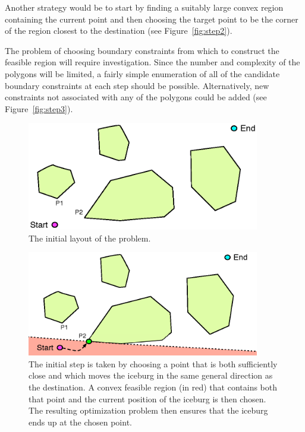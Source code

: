 \documentclass[12pt]{article}
\begin{document}
Another strategy would be to start by finding a suitably large convex region containing the current point and then
choosing the target point to be the corner of the region closest to the destination (see Figure~\ref{fig:step2}).

The problem of choosing boundary constraints from which to construct the feasible region will require investigation.
Since the number and complexity of the polygons will be limited, a fairly simple enumeration of all of the candidate
boundary constraints at each step should be possible. Alternatively, new constraints
not associated with any of the polygons could be added (see Figure~\ref{fig:step3}).


\begin{figure}[h]
\centering
\includegraphics[width=4in]{base}
\caption{The initial layout of the problem.}
\label{fig:base}
\end{figure}

\begin{figure}[h]
\centering
\includegraphics[width=4in]{step1}
\caption{The initial step is taken by choosing a point that is both sufficiently close and which moves the iceburg
in the same general direction as the destination. A convex feasible region (in red) that contains both that point
and the current position of the iceburg is then chosen. The resulting optimization problem then ensures that the
iceburg ends up at the chosen point.}
\label{fig:step1}
\end{figure}
\end{document}
